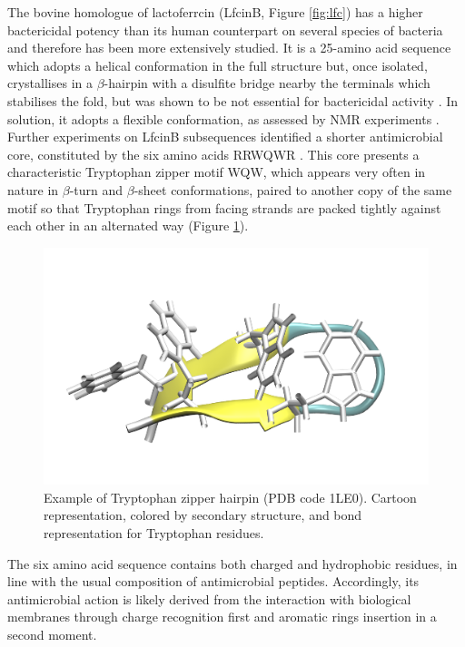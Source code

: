 The bovine homologue of lactoferrcin (LfcinB, Figure \ref{fig:lfc}) has a higher bactericidal potency than its human counterpart on several species of bacteria \citep{Cochran2001} and therefore has been more extensively studied. It is a 25-amino acid sequence which adopts a helical conformation in the full structure but, once isolated, crystallises in a $\beta$-hairpin with a disulfite bridge nearby the terminals which stabilises the fold, but was shown to be not essential for bactericidal activity \citep{Cochran2001}.
%
In solution, it adopts a flexible conformation, as assessed by NMR experiments \citep{Hwang1998}. 
%
Further experiments on LfcinB subsequences identified a shorter antimicrobial core, constituted by the six amino acids RRWQWR \citep{Schibli1999}. This core presents a characteristic Tryptophan zipper motif WQW, which appears very often in nature in $\beta$-turn and $\beta$-sheet conformations, paired to another copy of the same motif \citep{Cochran2001} so that Tryptophan rings from facing strands are packed tightly against each other in an alternated way (Figure \ref{fig:trp_zip}).

\begin{figure}
\begin{center}
\includegraphics[width=0.5\linewidth]{1introduction/pics/trp_zip}
\caption[TRyptophan zipper 1LE0]{Example of Tryptophan zipper hairpin (PDB code 1LE0). Cartoon representation, colored by secondary structure, and bond representation for Tryptophan residues.} \label{fig:trp_zip}
\end{center}
\end{figure}

The six amino acid sequence contains both charged and hydrophobic residues, in line with the usual composition of antimicrobial peptides. Accordingly, its antimicrobial action is likely derived from the interaction with biological membranes through charge recognition first and aromatic rings insertion in a second moment.

